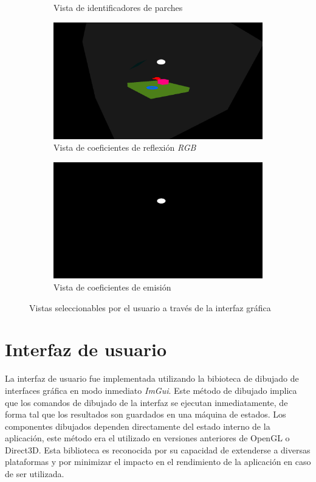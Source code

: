\begin{figure}[H]
\begin{subfigure}{0.4\textwidth}
		\caption{Vista de identificadores de parches}
	\end{subfigure}
	\begin{subfigure}{0.4\textwidth}
		\includegraphics[width=1\linewidth]{assets/display-view(2)}
		\caption{Vista de coeficientes de reflexión \textit{RGB}}
	\end{subfigure}
	\begin{subfigure}{0.4\textwidth}
		\includegraphics[width=1\linewidth]{assets/display-view(5)}
		\caption{Vista de coeficientes de emisión}
	\end{subfigure}
	\caption{Vistas seleccionables por el usuario a través de la interfaz gráfica}
	\label{img:displayed}
\end{figure}

\section {Interfaz de usuario}

La interfaz de usuario fue implementada utilizando la bibioteca de dibujado de interfaces gráfica en modo inmediato \textit{ImGui}. Este método de dibujado implica que los comandos de dibujado de la interfaz se ejecutan inmediatamente, de forma tal que los resultados son guardados en una máquina de estados. Los componentes dibujados dependen directamente del estado interno de la aplicación, este método era el utilizado en versiones anteriores de OpenGL o Direct3D. Esta biblioteca es reconocida por su capacidad de extenderse a diversas plataformas y por minimizar el impacto en el rendimiento de la aplicación en caso de ser utilizada.

